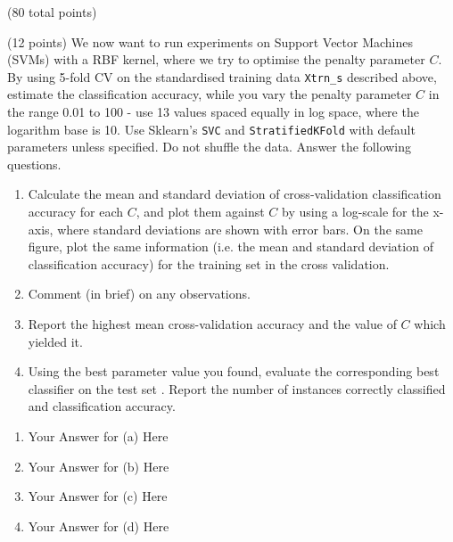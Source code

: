 \documentclass[12pt]{article}
\begin{document}
\begin{question}{(80 total points) \qOneTitle}
\begin{subquestion}{(12 points)
    We now want to run experiments on Support Vector Machines (SVMs) with a RBF kernel, where we try to optimise the penalty parameter $C$.
    By using 5-fold CV on the standardised training data {\tt Xtrn\_s} described above, estimate the classification accuracy, while you vary the penalty parameter $C$ in the range 0.01 to 100 - use 13 values spaced equally in log space, where the logarithm base is 10.
    Use Sklearn's {\tt SVC} and {\tt StratifiedKFold} with default parameters unless specified. Do not shuffle the data.
  } \label{q1:svm}
  Answer the following questions.
  \begin{enumerate}\NARROWITEM
  \item Calculate the mean and standard deviation of cross-validation classification accuracy for each $C$, and plot them against $C$ by using a log-scale for the x-axis, where standard deviations are shown with error bars.
    On the same figure, plot the same information (i.e. the mean and standard deviation of classification accuracy) for the training set in the cross validation.
  \item Comment (in brief) on any observations. 
  \item Report the highest mean cross-validation accuracy and the value of $C$ which yielded it.
  \item Using the best parameter value you found, evaluate the corresponding best classifier on the test set . Report the number of instances correctly classified and classification accuracy.
  \end{enumerate}
   

  \begin{answerbox}{0.65\textheight}
    \begin{enumerate}
    \item Your Answer for (a) Here
    \item Your Answer for (b) Here
    \item Your Answer for (c) Here
    \item Your Answer for (d) Here
    \end{enumerate}
  \end{answerbox}
  


\end{subquestion}


\end{question}
\end{document}

